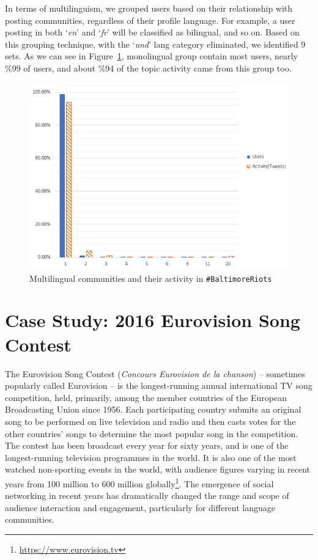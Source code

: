 In terms of multilinguism, we grouped users based on their relationship with
posting communities, regardless of their profile language. For
example, a user posting in both `{\emph{en}}' and `{\emph{fr}}' will
be classified as bilingual, and so on. Based on this grouping
technique, with the `{\emph{und}}' lang category eliminated, we
identified 9 sets. As we can see in Figure~\ref{fig:baltimore_multilingual}, 
monolingual group contain most users, nearly \%99 of users, and about 
\%94 of the topic activity came from this group too.


\begin{figure}
\centering
\includegraphics[width=\columnwidth]{images/baltimore_multilingual.png}
\caption{Multilingual communities and their activity in {\texttt{\#BaltimoreRiots}}}
\label{fig:baltimore_multilingual}
\end{figure}


\section{Case Study: 2016 Eurovision Song Contest}\label{eurovisioncasestudy}

The Eurovision Song Contest ({\emph{Concours Eurovision de la
chanson}}) -- sometimes popularly called Eurovision -- is the
longest-running annual international TV song competition, held,
primarily, among the member countries of the European Broadcasting
Union since 1956. Each participating country submits an original
song to be performed on live television and radio and then casts votes
for the other countries' songs to determine the most popular song in
the competition. The contest has been broadcast every year for sixty
years, and is one of the longest-running television programmes in the
world. It is also one of the most watched non-sporting events in the
world, with audience figures varying in recent years from 100 million
to 600 million globally\footnote{\url{https://www.eurovision.tv}}. The
emergence of social networking in recent years has dramatically
changed the range and scope of audience interaction and engagement,
particularly for different language communities.

